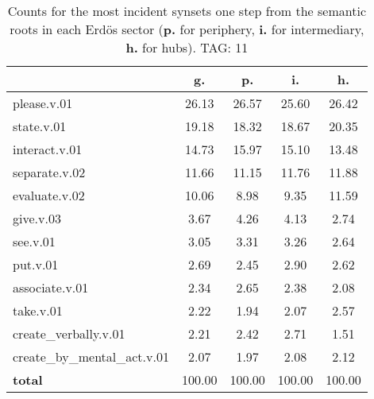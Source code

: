 \begin{table}[h!]
\begin{center}
\begin{tabular}{| l | c | c | c | c |}\hline
 & g. & p. & i. & h. \\\hline
please.v.01 & 26.13  & 26.57  & 25.60  & 26.42 \\\hline
state.v.01 & 19.18  & 18.32  & 18.67  & 20.35 \\\hline
interact.v.01 & 14.73  & 15.97  & 15.10  & 13.48 \\\hline
separate.v.02 & 11.66  & 11.15  & 11.76  & 11.88 \\\hline
evaluate.v.02 & 10.06  & 8.98  & 9.35  & 11.59 \\\hline
give.v.03 & 3.67  & 4.26  & 4.13  & 2.74 \\\hline
see.v.01 & 3.05  & 3.31  & 3.26  & 2.64 \\\hline
put.v.01 & 2.69  & 2.45  & 2.90  & 2.62 \\\hline
associate.v.01 & 2.34  & 2.65  & 2.38  & 2.08 \\\hline
take.v.01 & 2.22  & 1.94  & 2.07  & 2.57 \\\hline
create\_verbally.v.01 & 2.21  & 2.42  & 2.71  & 1.51 \\\hline
create\_by\_mental\_act.v.01 & 2.07  & 1.97  & 2.08  & 2.12 \\\hline
{{\bf total}} & 100.00  & 100.00  & 100.00  & 100.00 \\\hline
\end{tabular}
\caption{Counts for the most incident synsets one step from the semantic roots in each Erd\"os sector ({\bf p.} for periphery, {\bf i.} for intermediary, {\bf h.} for hubs). TAG: 11}
\end{center}
\end{table}